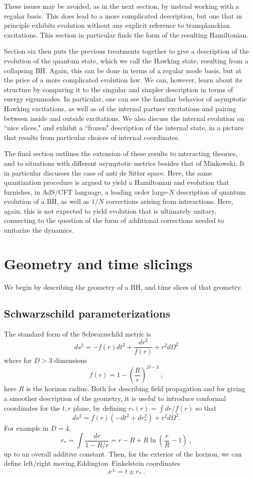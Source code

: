 \documentclass[12pt]{article}
\numberwithin{equation}{section}
\newcommand{\beq}{\begin{equation}}
\newcommand{\eeq}{\end{equation}}
\begin{document}
These issues may be avoided, as in the next section, by  instead working with a regular basis.  This does lead to a more complicated description, but one that in principle exhibits evolution without any explicit reference to transplanckian excitations.  This section in particular finds the form of the resulting Hamiltonian.  

Section six then puts the previous treatments together to give a description of the evolution of the quantum state, which we call the Hawking state, resulting from a collapsing BH. Again, this can be done in terms of a regular mode basis, but at the price of a more complicated evolution law.  We can, however, learn about its structure by comparing it to the singular and simpler description in terms of energy eigenmodes.  In particular, one can see the familiar behavior of asymptotic Hawking excitations, as well as of the internal partner excitations and pairing between inside and outside excitations.  We also discuss the internal evolution on ``nice slices," and exhibit a ``frozen" description of the internal state, in a picture that results from particular choices of internal coordinates.  

The final section outlines the extension of these results to interacting theories, and to situations with different asymptotic metrics besides that of Minkowski.  It in particular discusses the case of anti de Sitter space.  Here, the same quantization procedure is argued to yield a Hamiltonian and evolution that furnishes, in AdS/CFT language, a leading order large-$N$ description of quantum evolution of a BH, as well as $1/N$ corrections arising from interactions.  Here, again, this is not expected to yield evolution that is ultimately unitary, connecting to the question of the form of additional corrections needed to unitarize the dynamics.



\section{Geometry and time slicings}\label{Slicing}

We begin by describing the geometry of a BH, and time slices of that geometry.

\subsection{Schwarzschild parameterizations} 
The standard form of the Schwarzschild metric is
\beq
\label{Schmet}
ds^2 = -f(r) dt^2 + \frac{dr^2}{f(r)} + r^2 d\Omega^2
\eeq
where for $D>3$ dimensions
\beq
f(r) = 1-\left(\frac{R}{r}\right)^{D-3}\ ;
\eeq
here $R$ is the horizon radius.  Both for describing field propagation and for giving a smoother description of the geometry, it
 is useful to introduce conformal coordinates for the $t,r$ plane, by defining $r_*(r) = \int dr/{f(r)}$ so that
\beq
\label{rstarmet}
ds^2 = f(r)(- dt^2 +dr_*^2) + r^2 d\Omega^2.
\eeq
For example in $D=4$, 
\beq
r_* = \int \frac{dr}{1-R/r} = r-R+R\ln\left(\frac{r}{R}-1\right)\ ,
\eeq
up to an overall additive constant.  
Then, for the exterior of the horizon, we can define left/right moving Eddington--Finkelstein coordinates 
\beq\label{xpdef}
x^\pm = t\pm r_*\ .
\eeq
\end{document}
